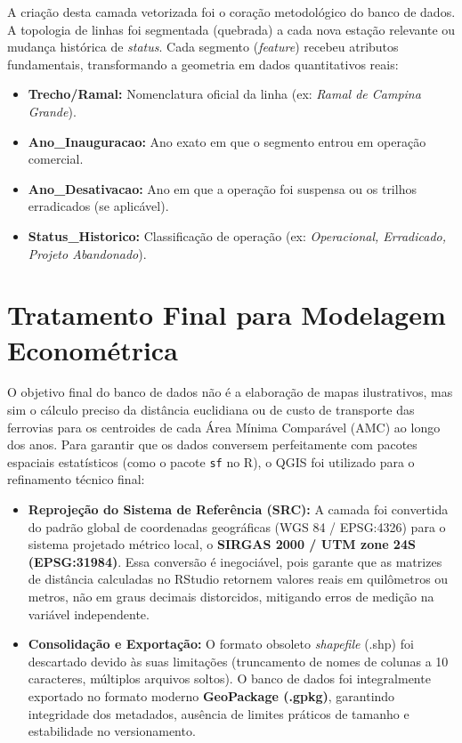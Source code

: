 \documentclass[11pt, a4paper]{article}
\begin{document}
A criação desta camada vetorizada foi o coração metodológico do banco de dados. A topologia de linhas foi segmentada (quebrada) a cada nova estação relevante ou mudança histórica de \textit{status}. Cada segmento (\textit{feature}) recebeu atributos fundamentais, transformando a geometria em dados quantitativos reais:

\begin{itemize}
    \item \textbf{Trecho/Ramal:} Nomenclatura oficial da linha (ex: \textit{Ramal de Campina Grande}).
    \item \textbf{Ano\_Inauguracao:} Ano exato em que o segmento entrou em operação comercial.
    \item \textbf{Ano\_Desativacao:} Ano em que a operação foi suspensa ou os trilhos erradicados (se aplicável).
    \item \textbf{Status\_Historico:} Classificação de operação (ex: \textit{Operacional, Erradicado, Projeto Abandonado}).
\end{itemize}

\section{Tratamento Final para Modelagem Econométrica}

O objetivo final do banco de dados não é a elaboração de mapas ilustrativos, mas sim o cálculo preciso da distância euclidiana ou de custo de transporte das ferrovias para os centroides de cada Área Mínima Comparável (AMC) ao longo dos anos. Para garantir que os dados conversem perfeitamente com pacotes espaciais estatísticos (como o pacote \texttt{sf} no R), o QGIS foi utilizado para o refinamento técnico final:

\begin{itemize}
    \item \textbf{Reprojeção do Sistema de Referência (SRC):} A camada foi convertida do padrão global de coordenadas geográficas (WGS 84 / EPSG:4326) para o sistema projetado métrico local, o \textbf{SIRGAS 2000 / UTM zone 24S (EPSG:31984)}. Essa conversão é inegociável, pois garante que as matrizes de distância calculadas no RStudio retornem valores reais em quilômetros ou metros, não em graus decimais distorcidos, mitigando erros de medição na variável independente.
    \item \textbf{Consolidação e Exportação:} O formato obsoleto \textit{shapefile} (.shp) foi descartado devido às suas limitações (truncamento de nomes de colunas a 10 caracteres, múltiplos arquivos soltos). O banco de dados foi integralmente exportado no formato moderno \textbf{GeoPackage (.gpkg)}, garantindo integridade dos metadados, ausência de limites práticos de tamanho e estabilidade no versionamento.
\end{itemize}
\end{document}
